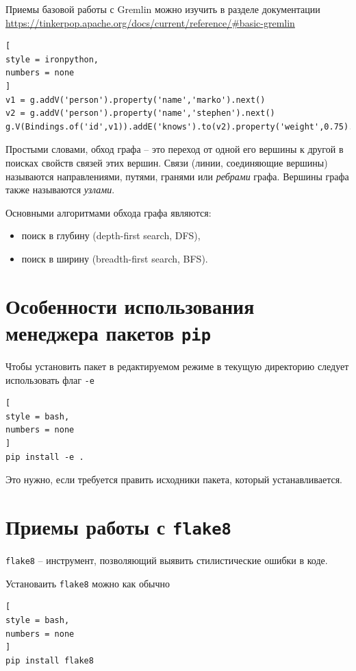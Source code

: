 \documentclass[%
	11pt,
	a4paper,
	utf8,
		]{article}
\begin{document}
Приемы базовой работы с Gremlin можно изучить в разделе документации \url{https://tinkerpop.apache.org/docs/current/reference/#basic-gremlin}
\begin{lstlisting}[
style = ironpython,
numbers = none
]
v1 = g.addV('person').property('name','marko').next()
v2 = g.addV('person').property('name','stephen').next()
g.V(Bindings.of('id',v1)).addE('knows').to(v2).property('weight',0.75).iterate()
\end{lstlisting}

Простыми словами, обход графа -- это переход от одной его вершины к другой в поисках свойств связей этих вершин. Связи (линии, соединяющие вершины) называются направлениями, путями, гранями или \emph{ребрами} графа. Вершины графа также называются \emph{узлами}.

Основными алгоритмами обхода графа являются:
\begin{itemize}
	\item поиск в глубину (depth-first search, DFS),
	
	\item поиск в ширину (breadth-first search, BFS).
\end{itemize}



\section{Особенности использования менеджера пакетов \texttt{pip}}

Чтобы установить пакет в редактируемом режиме в текущую директорию следует использовать флаг \verb*|-e|
\begin{lstlisting}[
style = bash,
numbers = none
]
pip install -e .
\end{lstlisting}

Это нужно, если требуется править исходники пакета, который устанавливается.


\section{Приемы работы с \texttt{flake8}}

\texttt{flake8} -- инструмент, позволяющий выявить стилистические ошибки в коде.

Установаить \texttt{flake8} можно как обычно
\begin{lstlisting}[
style = bash,
numbers = none	
]
pip install flake8
\end{lstlisting} 
\end{document}
